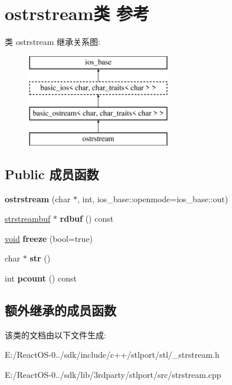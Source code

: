 \hypertarget{classostrstream}{}\section{ostrstream类 参考}
\label{classostrstream}
类 ostrstream 继承关系图\+:\begin{figure}[H]
\begin{center}
\leavevmode
\includegraphics[height=4.000000cm]{classostrstream}
\end{center}
\end{figure}
\subsection*{Public 成员函数}
\begin{DoxyCompactItemize}
\item 
\mbox{\label{classostrstream_ad83398eb481cb44b8a5f826970421fd8}} 
{\bfseries ostrstream} (char $\ast$, int, ios\+\_\+base\+::openmode=ios\+\_\+base\+::out)
\item 
\mbox{\label{classostrstream_ad3d2ce52c5972d9b2c858fac5d2ddb8e}} 
\hyperlink{classstrstreambuf}{strstreambuf} $\ast$ {\bfseries rdbuf} () const
\item 
\mbox{\label{classostrstream_a52271f850d490dd110e08a8f5f7894e5}} 
\hyperlink{interfacevoid}{void} {\bfseries freeze} (bool=true)
\item 
\mbox{\label{classostrstream_a488e0695aaf79f60169a5f21c10d2385}} 
char $\ast$ {\bfseries str} ()
\item 
\mbox{\label{classostrstream_aea8447f3f6678edc4dda4b6e5b82164d}} 
int {\bfseries pcount} () const
\end{DoxyCompactItemize}
\subsection*{额外继承的成员函数}


该类的文档由以下文件生成\+:\begin{DoxyCompactItemize}
\item 
E\+:/\+React\+O\+S-\/0../sdk/include/c++/stlport/stl/\+\_\+strstream.\+h\item 
E\+:/\+React\+O\+S-\/0../sdk/lib/3rdparty/stlport/src/strstream.\+cpp\end{DoxyCompactItemize}
